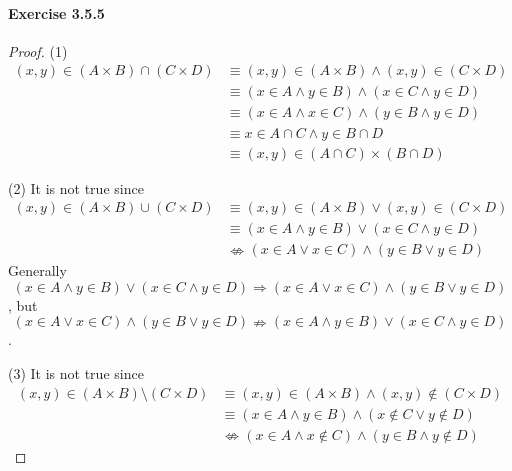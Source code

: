 \paragraph{Exercise 3.5.5} \label{exercise3.5.5}
\begin{proof}
(1)
\begin{align*}
(x,y) \in (A \times B) \cap (C \times D) 
&\equiv (x,y) \in (A \times B) \wedge (x,y) \in (C \times D) \\
&\equiv (x \in A \wedge y \in B) \wedge (x \in C \wedge y \in D) \\
&\equiv (x \in A \wedge x \in C) \wedge (y \in B \wedge y \in D) \\
&\equiv x \in A \cap C \wedge y \in B \cap D \\
&\equiv (x,y) \in (A \cap C) \times (B \cap D)
\end{align*}

(2) It is not true since 
\begin{align*}
(x,y) \in (A \times B) \cup (C \times D) 
&\equiv (x,y) \in (A \times B) \vee (x,y) \in (C \times D) \\
&\equiv (x \in A \wedge y \in B) \vee (x \in C \wedge y \in D) \\
&\nLeftrightarrow (x \in A \vee x \in C) \wedge (y \in B \vee y \in D)
\end{align*}
Generally 
\[
(x \in A \wedge y \in B) \vee (x \in C \wedge y \in D) \Longrightarrow 
(x \in A \vee x \in C) \wedge (y \in B \vee y \in D)
\], 
but
\[
(x \in A \vee x \in C) \wedge (y \in B \vee y \in D) \nRightarrow
(x \in A \wedge y \in B) \vee (x \in C \wedge y \in D)
\].

(3) It is not true since
\begin{align*}
(x,y) \in (A \times B) \setminus (C \times D) 
&\equiv (x,y) \in (A \times B) \wedge (x,y) \notin (C \times D) \\
&\equiv (x \in A \wedge y \in B) \wedge (x \notin C \vee y \notin D) \\
&\nLeftrightarrow (x \in A \wedge x \notin C) \wedge (y \in B \wedge y \notin D)
\end{align*}
\end{proof}

